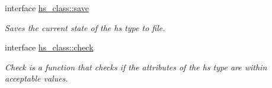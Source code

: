 \begin{DoxyCompactItemize}
interface \hyperlink{interfacehs__class_1_1save}{hs\-\_\-class\-::save}
\begin{DoxyCompactList}\small\item\em Saves the current state of the hs type to file. \end{DoxyCompactList}\item 
interface \hyperlink{interfacehs__class_1_1check}{hs\-\_\-class\-::check}
\begin{DoxyCompactList}\small\item\em Check is a function that checks if the attributes of the hs type are within acceptable values. \end{DoxyCompactList}\end{DoxyCompactItemize}

